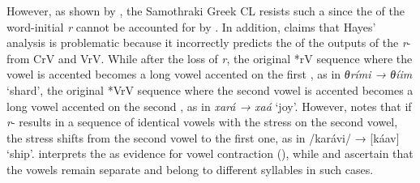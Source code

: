 \documentclass[output=paper,
modfonts
]{LSP/langsci}
\begin{document}
However, as shown by \citet{topintzi2006k}, the Samothraki Greek CL resists
such a  since the  of the word-initial \emph{r} cannot
be accounted for by . In addition, \citet{kiparsky2011k} claims that
Hayes' analysis is problematic because it incorrectly predicts the
 of the outputs of the \emph{r}- from CrV and VrV. While
after the loss of \emph{r}, the original *rV sequence where the vowel is
accented becomes a long vowel accented on the first , as in
\emph{θrími → θíim} `shard', the original *VrV sequence where the second
vowel is accented becomes a long vowel accented on the second , as
in \emph{xará → xaá} `joy'. However, \citet[91]{heisenberg1934} notes that if
\emph{r}- results in a sequence of identical vowels with the
stress on the second vowel, the stress shifts from the second vowel to
the first one, as in /karávi/ → {[}káav{]} `ship'. \citet[79]{newton1972b}
interprets the  as evidence for vowel contraction
(), while \citet[90]{heisenberg1934} and \citet{margariti-Rogka2011} ascertain that the vowels remain separate and belong to
different syllables in such cases.
\end{document}
